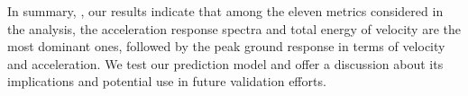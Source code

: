 In summary, , our results indicate that 
among the eleven metrics considered in the analysis, the acceleration response spectra and total energy of velocity are the most dominant ones, followed by the peak ground response in terms of velocity and acceleration. We test our prediction model and offer a discussion about its implications and potential use in future validation efforts.
